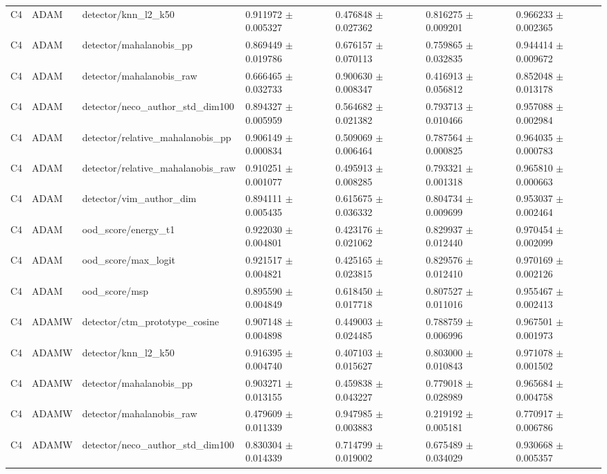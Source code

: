 \begin{longtable}{lllllll}
C4 & ADAM & detector/knn\_l2\_k50 & 0.911972 $\pm$ 0.005327 & 0.476848 $\pm$ 0.027362 & 0.816275 $\pm$ 0.009201 & 0.966233 $\pm$ 0.002365 \\
C4 & ADAM & detector/mahalanobis\_pp & 0.869449 $\pm$ 0.019786 & 0.676157 $\pm$ 0.070113 & 0.759865 $\pm$ 0.032835 & 0.944414 $\pm$ 0.009672 \\
C4 & ADAM & detector/mahalanobis\_raw & 0.666465 $\pm$ 0.032733 & 0.900630 $\pm$ 0.008347 & 0.416913 $\pm$ 0.056812 & 0.852048 $\pm$ 0.013178 \\
C4 & ADAM & detector/neco\_author\_std\_dim100 & 0.894327 $\pm$ 0.005959 & 0.564682 $\pm$ 0.021382 & 0.793713 $\pm$ 0.010466 & 0.957088 $\pm$ 0.002984 \\
C4 & ADAM & detector/relative\_mahalanobis\_pp & 0.906149 $\pm$ 0.000834 & 0.509069 $\pm$ 0.006464 & 0.787564 $\pm$ 0.000825 & 0.964035 $\pm$ 0.000783 \\
C4 & ADAM & detector/relative\_mahalanobis\_raw & 0.910251 $\pm$ 0.001077 & 0.495913 $\pm$ 0.008285 & 0.793321 $\pm$ 0.001318 & 0.965810 $\pm$ 0.000663 \\
C4 & ADAM & detector/vim\_author\_dim & 0.894111 $\pm$ 0.005435 & 0.615675 $\pm$ 0.036332 & 0.804734 $\pm$ 0.009699 & 0.953037 $\pm$ 0.002464 \\
C4 & ADAM & ood\_score/energy\_t1 & 0.922030 $\pm$ 0.004801 & 0.423176 $\pm$ 0.021062 & 0.829937 $\pm$ 0.012440 & 0.970454 $\pm$ 0.002099 \\
C4 & ADAM & ood\_score/max\_logit & 0.921517 $\pm$ 0.004821 & 0.425165 $\pm$ 0.023815 & 0.829576 $\pm$ 0.012410 & 0.970169 $\pm$ 0.002126 \\
C4 & ADAM & ood\_score/msp & 0.895590 $\pm$ 0.004849 & 0.618450 $\pm$ 0.017718 & 0.807527 $\pm$ 0.011016 & 0.955467 $\pm$ 0.002413 \\
C4 & ADAMW & detector/ctm\_prototype\_cosine & 0.907148 $\pm$ 0.004898 & 0.449003 $\pm$ 0.024485 & 0.788759 $\pm$ 0.006996 & 0.967501 $\pm$ 0.001973 \\
C4 & ADAMW & detector/knn\_l2\_k50 & 0.916395 $\pm$ 0.004740 & 0.407103 $\pm$ 0.015627 & 0.803000 $\pm$ 0.010843 & 0.971078 $\pm$ 0.001502 \\
C4 & ADAMW & detector/mahalanobis\_pp & 0.903271 $\pm$ 0.013155 & 0.459838 $\pm$ 0.043227 & 0.779018 $\pm$ 0.028989 & 0.965684 $\pm$ 0.004758 \\
C4 & ADAMW & detector/mahalanobis\_raw & 0.479609 $\pm$ 0.011339 & 0.947985 $\pm$ 0.003883 & 0.219192 $\pm$ 0.005181 & 0.770917 $\pm$ 0.006786 \\
C4 & ADAMW & detector/neco\_author\_std\_dim100 & 0.830304 $\pm$ 0.014339 & 0.714799 $\pm$ 0.019002 & 0.675489 $\pm$ 0.034029 & 0.930668 $\pm$ 0.005357 \\

\end{longtable}
